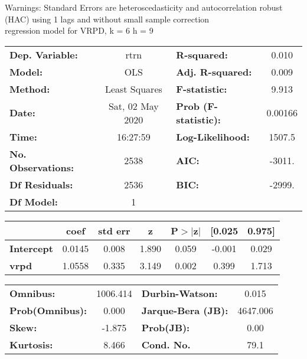 Warnings: \newline
 [1] Standard Errors are heteroscedasticity and autocorrelation robust (HAC) using 1 lags and without small sample correction\\ 

regression model for VRPD, k = 6 h = 9\begin{center}
\begin{tabular}{lclc}
\toprule
\textbf{Dep. Variable:}    &       rtrn       & \textbf{  R-squared:         } &     0.010   \\
\textbf{Model:}            &       OLS        & \textbf{  Adj. R-squared:    } &     0.009   \\
\textbf{Method:}           &  Least Squares   & \textbf{  F-statistic:       } &     9.913   \\
\textbf{Date:}             & Sat, 02 May 2020 & \textbf{  Prob (F-statistic):} &  0.00166    \\
\textbf{Time:}             &     16:27:59     & \textbf{  Log-Likelihood:    } &    1507.5   \\
\textbf{No. Observations:} &        2538      & \textbf{  AIC:               } &    -3011.   \\
\textbf{Df Residuals:}     &        2536      & \textbf{  BIC:               } &    -2999.   \\
\textbf{Df Model:}         &           1      & \textbf{                     } &             \\
\bottomrule
\end{tabular}
\begin{tabular}{lcccccc}
                   & \textbf{coef} & \textbf{std err} & \textbf{z} & \textbf{P$> |$z$|$} & \textbf{[0.025} & \textbf{0.975]}  \\
\midrule
\textbf{Intercept} &       0.0145  &        0.008     &     1.890  &         0.059        &       -0.001    &        0.029     \\
\textbf{vrpd}      &       1.0558  &        0.335     &     3.149  &         0.002        &        0.399    &        1.713     \\
\bottomrule
\end{tabular}
\begin{tabular}{lclc}
\textbf{Omnibus:}       & 1006.414 & \textbf{  Durbin-Watson:     } &    0.015  \\
\textbf{Prob(Omnibus):} &   0.000  & \textbf{  Jarque-Bera (JB):  } & 4647.006  \\
\textbf{Skew:}          &  -1.875  & \textbf{  Prob(JB):          } &     0.00  \\
\textbf{Kurtosis:}      &   8.466  & \textbf{  Cond. No.          } &     79.1  \\
\bottomrule
\end{tabular}
\end{center}

